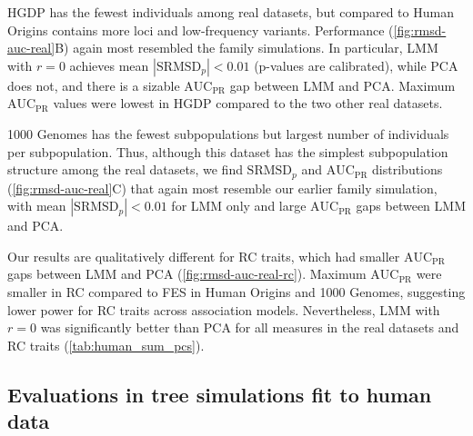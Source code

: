 \documentclass[11pt]{article}
\newcommand{\rmsd}{\text{SRMSD}_p}
\newcommand{\auc}{\text{AUC}_\text{PR}}
\begin{document}
\begin{linenumbers}
HGDP has the fewest individuals among real datasets, but compared to Human Origins contains more loci and low-frequency variants.
Performance (\cref{fig:rmsd-auc-real}B) again most resembled the family simulations.
In particular, LMM with $r=0$ achieves mean $|\rmsd| < 0.01$ (p-values are calibrated), while PCA does not, and there is a sizable $\auc$ gap between LMM and PCA.
Maximum $\auc$ values were lowest in HGDP compared to the two other real datasets.

1000 Genomes has the fewest subpopulations but largest number of individuals per subpopulation.
Thus, although this dataset has the simplest subpopulation structure among the real datasets, we find $\rmsd$ and $\auc$ distributions (\cref{fig:rmsd-auc-real}C) that again most resemble our earlier family simulation, with mean $|\rmsd| < 0.01$ for LMM only and large $\auc$ gaps between LMM and PCA.

Our results are qualitatively different for RC traits, which had smaller $\auc$ gaps between LMM and PCA (\cref{fig:rmsd-auc-real-rc}).
Maximum $\auc$ were smaller in RC compared to FES in Human Origins and 1000 Genomes, suggesting lower power for RC traits across association models.
Nevertheless, LMM with $r=0$ was significantly better than PCA for all measures in the real datasets and RC traits (\cref{tab:human_sum_pcs}).

\subsection{Evaluations in tree simulations fit to human data}


\end{linenumbers}
\end{document}

